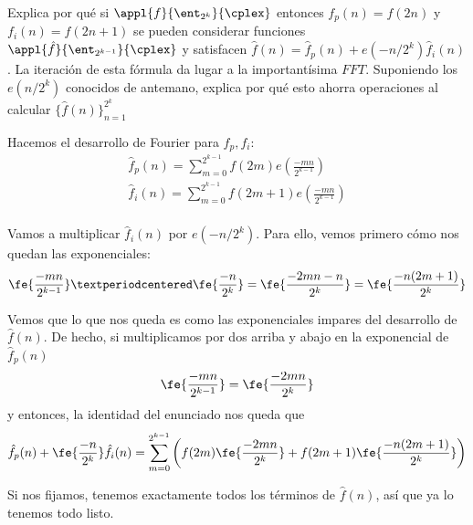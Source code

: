 \begin{problem}[18]
Explica por qué si $\appl{f}{\ent_{2^k}}{\cplex}$ entonces $f_p(n)=f(2n)$ y $f_i(n)=f(2n+1)$ se pueden considerar funciones $\appl{\hat{f}}{\ent_{2^{k-1}}}{\cplex}$ y satisfacen $\hat{f}(n)=\hat{f}_p(n)+e(-n/2^k)\hat{f}_i(n)$. La iteración de esta fórmula da lugar a la importantísima $FFT$. Suponiendo los $e(n/2^k)$ conocidos de antemano, explica por qué esto ahorra operaciones al calcular $\{\hat{f}(n)\}_{n=1}^{2^k}$
\solution

Hacemos el desarrollo de Fourier para $f_p, f_i$: \begin{gather*}
\hat{f}_p(n) = \sum_{m = 0}^{2^{k-1}} f(2m) e\left(\frac{-mn}{2^{k-1}}\right) \\
\hat{f}_i(n) = \sum_{m = 0}^{2^{k-1}} f(2m + 1) e\left(\frac{-mn}{2^{k-1}}\right) \\
\end{gather*}

Vamos a multiplicar $\hat{f}_i(n)$ por $e(-n/2^k)$. Para ello, vemos primero cómo nos quedan las exponenciales: \[ \fe{\frac{-mn}{2^{k-1}}} · \fe{\frac{-n}{2^k}} = \fe{\frac{-2mn - n}{2^k}} = \fe{\frac{-n(2m+1)}{2^k}} \]

Vemos que lo que nos queda es como las exponenciales impares del desarrollo de $\hat{f}(n)$. De hecho, si multiplicamos por dos arriba y abajo en la exponencial de $\hat{f}_p(n)$ \[ \fe{\frac{-mn}{2^{k-1}}} = \fe{\frac{-2mn}{2^k}} \] y entonces, la identidad del enunciado nos queda que \[ \hat{f}_p(n) + \fe{\frac{-n}{2^k}} \hat{f}_i(n) = \sum_{m=0}^{2^{k-1}} \left(f(2m)\fe{\frac{-2mn}{2^k}} + f(2m+1)\fe{\frac{-n(2m+1)}{2^k}} \right) \]

Si nos fijamos, tenemos exactamente todos los términos de $\hat{f}(n)$, así que ya lo tenemos todo listo.
\end{problem}



\newpage
